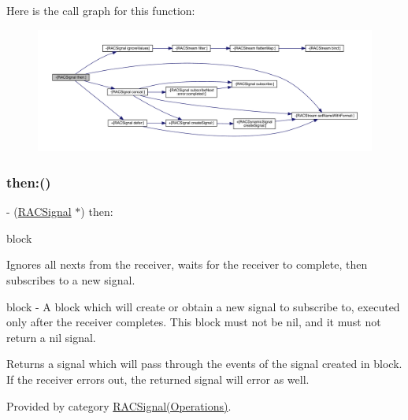 Here is the call graph for this function\+:\nopagebreak
\begin{figure}[H]
\begin{center}
\leavevmode
\includegraphics[width=350pt]{interface_r_a_c_signal_aeed35de5a36e70f87721a0ad6ffabecd_cgraph}
\end{center}
\end{figure}
\mbox{\label{interface_r_a_c_signal_aeed35de5a36e70f87721a0ad6ffabecd}} 
\subsubsection{\texorpdfstring{then\+:()}{then:()}\hspace{0.1cm}{\footnotesize\ttfamily [2/3]}}
{\footnotesize\ttfamily -\/ (\mbox{\hyperlink{interface_r_a_c_signal}{R\+A\+C\+Signal}} $\ast$) then\+: \begin{DoxyParamCaption}\item[{(\mbox{\hyperlink{interface_r_a_c_signal}{R\+A\+C\+Signal}} $\ast$($^\wedge$)(void))}]{block }\end{DoxyParamCaption}}

Ignores all {\ttfamily next}s from the receiver, waits for the receiver to complete, then subscribes to a new signal.

block -\/ A block which will create or obtain a new signal to subscribe to, executed only after the receiver completes. This block must not be nil, and it must not return a nil signal.

Returns a signal which will pass through the events of the signal created in {\ttfamily block}. If the receiver errors out, the returned signal will error as well. 

Provided by category \mbox{\hyperlink{category_r_a_c_signal_07_operations_08_aeed35de5a36e70f87721a0ad6ffabecd}{R\+A\+C\+Signal(\+Operations)}}.

\mbox{\label{interface_r_a_c_signal_aeed35de5a36e70f87721a0ad6ffabecd}} 
